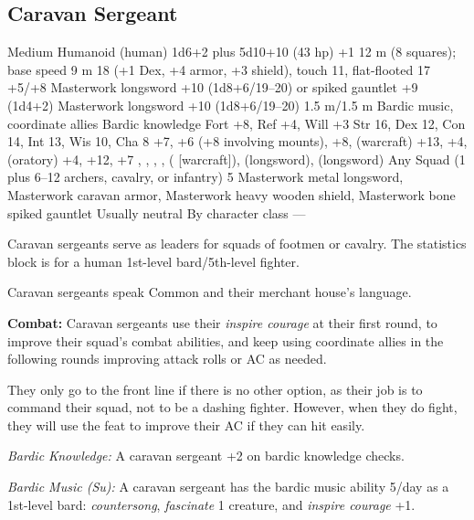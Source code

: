 \subsection{Caravan Sergeant}
\begin{MonsterStats}
{Medium Humanoid (human)}
{1d6+2 plus 5d10+10 (43 hp)}
{+1}
{12 m (8 squares); base speed 9 m}
{18 (+1 Dex, +4 armor, +3 shield), touch 11, flat-flooted 17}
{+5/+8}
{Masterwork longsword +10 (1d8+6/19--20) or spiked gauntlet +9 (1d4+2)}
{Masterwork longsword +10 (1d8+6/19--20)}
{1.5 m/1.5 m}
{Bardic music, coordinate allies}
{Bardic knowledge}
{Fort +8, Ref +4, Will +3}
{Str 16, Dex 12, Con 14, Int 13, Wis 10, Cha 8}
{
	 +7,
	 +6 (+8 involving mounts),
	 +8,
	 (warcraft) +13,
	 +4,
	 (oratory) +4,
	 +12,
	 +7
}
{
	,
	,
	,
	,
	 ( [warcraft]),
	 (longsword),
	 (longsword)
}
{Any}
{Squad (1 plus 6--12 archers, cavalry, or infantry)}
{5}
{
	Masterwork metal longsword,
	Masterwork caravan armor,
	Masterwork heavy wooden shield,
	Masterwork bone spiked gauntlet
}
{Usually neutral}
{By character class}
{---}
\end{MonsterStats}

Caravan sergeants serve as leaders for squads of footmen or cavalry. The statistics block is for a human 1st-level bard/5th-level fighter.

Caravan sergeants speak Common and their merchant house's language.

\textbf{Combat:} Caravan sergeants use their \emph{inspire courage} at their first round, to improve their squad's combat abilities, and keep using coordinate allies in the following rounds improving attack rolls or AC as needed.

They only go to the front line if there is no other option, as their job is to command their squad, not to be a dashing fighter. However, when they do fight, they will use the  feat to improve their AC if they can hit easily.

\textit{Bardic Knowledge:} A caravan sergeant +2 on bardic knowledge checks.

\textit{Bardic Music (Su):} A caravan sergeant has the bardic music ability 5/day as a 1st-level bard: \emph{countersong}, \emph{fascinate} 1 creature, and \emph{inspire courage} +1.

